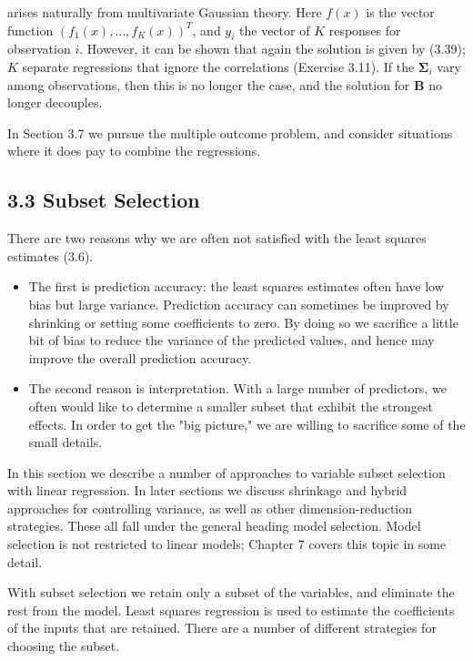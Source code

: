 \documentclass[10pt]{article}
\begin{document}
arises naturally from multivariate Gaussian theory. Here $f(x)$ is the vector function $\left(f_{1}(x), \ldots, f_{K}(x)\right)^{T}$, and $y_{i}$ the vector of $K$ responses for observation $i$. However, it can be shown that again the solution is given by (3.39); $K$ separate regressions that ignore the correlations (Exercise 3.11). If the $\boldsymbol{\Sigma}_{i}$ vary among observations, then this is no longer the case, and the solution for $\mathbf{B}$ no longer decouples.

In Section 3.7 we pursue the multiple outcome problem, and consider situations where it does pay to combine the regressions.

\subsection*{3.3 Subset Selection}
There are two reasons why we are often not satisfied with the least squares estimates (3.6).

\begin{itemize}
  \item The first is prediction accuracy: the least squares estimates often have low bias but large variance. Prediction accuracy can sometimes be improved by shrinking or setting some coefficients to zero. By doing so we sacrifice a little bit of bias to reduce the variance of the predicted values, and hence may improve the overall prediction accuracy.
  \item The second reason is interpretation. With a large number of predictors, we often would like to determine a smaller subset that exhibit the strongest effects. In order to get the "big picture," we are willing to sacrifice some of the small details.
\end{itemize}

In this section we describe a number of approaches to variable subset selection with linear regression. In later sections we discuss shrinkage and hybrid approaches for controlling variance, as well as other dimension-reduction strategies. These all fall under the general heading model selection. Model selection is not restricted to linear models; Chapter 7 covers this topic in some detail.

With subset selection we retain only a subset of the variables, and eliminate the rest from the model. Least squares regression is used to estimate the coefficients of the inputs that are retained. There are a number of different strategies for choosing the subset.
\end{document}
